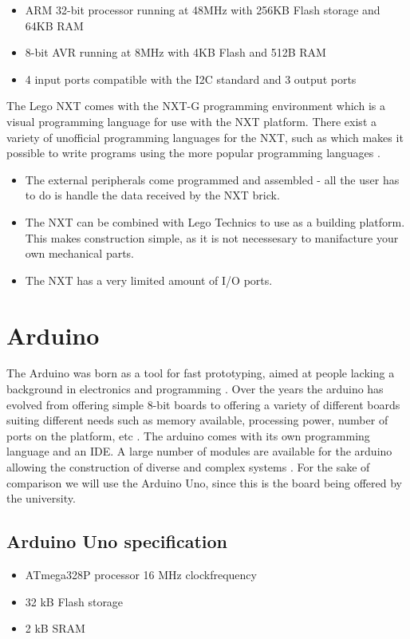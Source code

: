\begin{itemize}
  \item ARM 32-bit processor running at 48MHz with 256KB Flash storage and 64KB RAM
  \item 8-bit AVR running at 8MHz with 4KB Flash and 512B RAM
  \item 4 input ports compatible with the I2C standard and 3 output ports
\end{itemize}

The Lego NXT comes with the NXT-G programming environment which is a visual
programming language for use with the NXT platform. There exist a variety of
unofficial programming languages for the NXT, such as  which makes it possible to write programs using the more popular programming
languages \Source.

\begin{itemize}
  \item The external peripherals come programmed and assembled - all the user
  has to do is handle the data received by the NXT brick.
  \item The NXT can be combined with Lego Technics to use as a building
  platform. This makes construction simple, as it is not necessesary to
  manifacture your own mechanical parts.
  \item The NXT has a very limited amount of I/O ports.
\end{itemize}

\section{Arduino}
The Arduino was born as a tool for fast prototyping, aimed at people lacking a
background in electronics and programming \Source. Over the years the arduino has
evolved from offering simple 8-bit boards to offering a variety of different
boards suiting different needs such as memory available, processing power,
number of ports on the platform, etc \Source. The arduino comes with its
own programming language and an IDE. A large number of modules are available for
the arduino allowing the construction of diverse and complex systems \Source.
For the sake of comparison we will use the Arduino Uno, since this is the board being offered by
the university.

\subsection{Arduino Uno specification}
\Source
\begin{itemize}
  \item ATmega328P processor 16 MHz clockfrequency
  \item 32 kB Flash storage
  \item 2 kB SRAM
\end{itemize}


